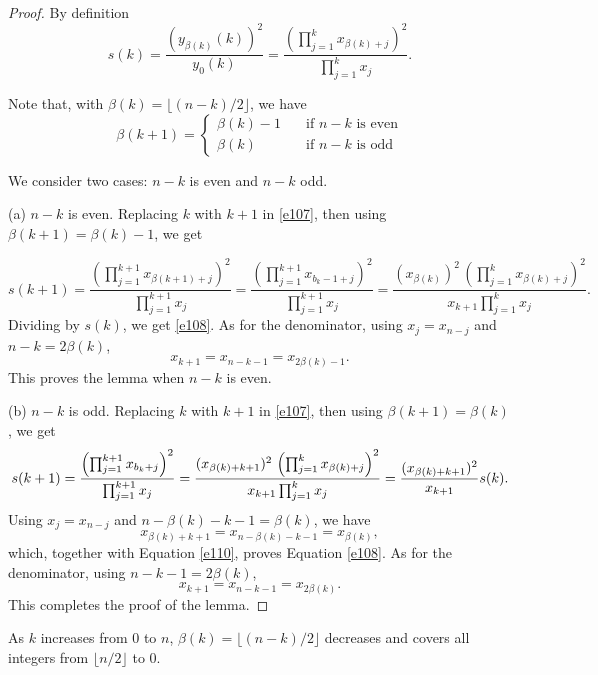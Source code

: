 \documentclass{amsart}
\theoremstyle{definition}
\def\printname#1{
    \if\draft y
        \smash{\makebox[0pt]{\hspace{-0.5in}
            \raisebox{8pt}{\tt\tiny #1}}}
    \fi
}
\def\lbl#1{\label{#1}\printname{#1}}
\begin{document}
\begin{proof}
By definition
\begin{equation}
s(k) = \frac{\left(y_{\beta(k)}(k)\right) ^2}{y_0(k)}
= \frac{\left( \prod_{j=1}^k  x_{\beta(k)+j}\right) ^2 }{\prod_{j=1}^k x_j}.
\label{e107}
\end{equation}

Note that, with $\beta(k)= \lfloor (n-k)/2 \rfloor$, we have
\begin{equation} \beta(k+1) = \begin{cases} \beta(k)-1 \quad &\text{if $n-k$ is even} \\
 \beta(k) \quad &\text{if $n-k$ is odd}
\end{cases}
\label{e111}
\end{equation}

We consider two cases: $n-k$ is even and $n-k$ odd.

(a) $n-k$ is even.  Replacing $k$ with $k+1$ in
\eqref{e107}, then using $\beta(k+1)= \beta(k)-1$, we get

$$
s(k+1) = \frac{\left( \prod_{j=1}^{k+1}  x_{\beta(k+1)+j}\right) ^2 }{\prod_{j=1}^{k+1} x_j}
= \frac{\left( \prod_{j=1}^{k+1}  x_{b_{k}-1+j}\right) ^2 }{\prod_{j=1}^{k+1} x_j}
= \frac{(x_{\beta(k)})^2 \, \left( \prod_{j=1}^k  x_{\beta(k)+j}\right) ^2 }{
x_{k+1} \prod_{j=1}^{k} x_j}.
$$
Dividing by $s(k)$, we get \eqref{e108}.
As for the denominator, using $x_j= x_{n-j}$ and $n-k= 2\beta(k)$,
$$ x_{k+1} = {x_{n-k-1}} ={x_{2\beta(k)- 1}}.$$
This proves the lemma when $n-k$ is even.

(b) $n-k$ is odd. 
Replacing $k$ with $k+1$ in \eqref{e107}, then using $\beta(k+1)= \beta(k)$,
we get
\begin{equation}
\lbl{e110}
s(k+1)  = \frac{\left( \prod_{j=1}^{k+1}  x_{b_{k}+j}\right)^2 }{\prod_{j=1}^{k+1} x_j}
= \frac{(x_{\beta(k)+k+1})^2 \, \left( \prod_{j=1}^k  x_{\beta(k)+j}\right) ^2 }{x_{k+1}
\prod_{j=1}^{k} x_j}=  \frac{(x_{\beta(k)+k+1})^2 }{x_{k+1} } s(k).
\end{equation}
Using $x_j = x_{n-j}$ and $n-\beta(k) -k-1 = \beta(k)$,
we have
$$
x_{\beta(k) + k+ 1} = x_{n-\beta(k) -k-1} = x_{\beta(k)},
$$
which, together with Equation \eqref{e110}, proves Equation \eqref{e108}.
As for the denominator, using $n-k-1 = 2\beta(k)$,
$$
x_{k+1} = x_{n-k-1} = x_{2 \beta(k)}.
$$
This completes the proof of the lemma.
\end{proof}


As $k$ increases from $0$ to $n$, $\beta(k) = \lfloor (n-k)/2 \rfloor$ decreases and covers all integers from  $\lfloor n/2 \rfloor$ to 0.  
\end{document}
